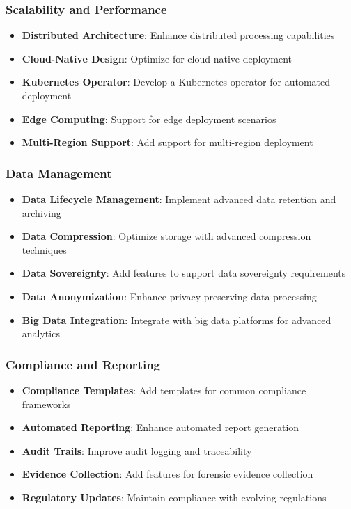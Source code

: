 \subsubsection{Scalability and Performance}
\begin{itemize}
    \item \textbf{Distributed Architecture}: Enhance distributed processing capabilities
    \item \textbf{Cloud-Native Design}: Optimize for cloud-native deployment
    \item \textbf{Kubernetes Operator}: Develop a Kubernetes operator for automated deployment
    \item \textbf{Edge Computing}: Support for edge deployment scenarios
    \item \textbf{Multi-Region Support}: Add support for multi-region deployment
\end{itemize}

\subsubsection{Data Management}
\begin{itemize}
    \item \textbf{Data Lifecycle Management}: Implement advanced data retention and archiving
    \item \textbf{Data Compression}: Optimize storage with advanced compression techniques
    \item \textbf{Data Sovereignty}: Add features to support data sovereignty requirements
    \item \textbf{Data Anonymization}: Enhance privacy-preserving data processing
    \item \textbf{Big Data Integration}: Integrate with big data platforms for advanced analytics
\end{itemize}

\subsubsection{Compliance and Reporting}
\begin{itemize}
    \item \textbf{Compliance Templates}: Add templates for common compliance frameworks
    \item \textbf{Automated Reporting}: Enhance automated report generation
    \item \textbf{Audit Trails}: Improve audit logging and traceability
    \item \textbf{Evidence Collection}: Add features for forensic evidence collection
    \item \textbf{Regulatory Updates}: Maintain compliance with evolving regulations
\end{itemize}


